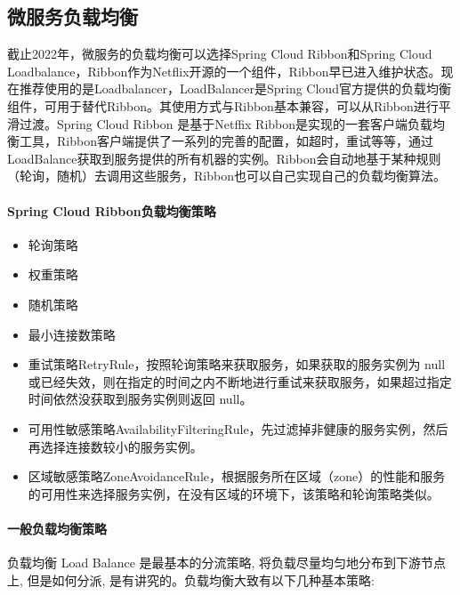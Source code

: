 \documentclass[../../../interview-questions.tex]{subfiles}
\begin{document}
\subsection{微服务负载均衡}

截止2022年，微服务的负载均衡可以选择Spring Cloud Ribbon和Spring Cloud Loadbalance，Ribbon作为Netflix开源的一个组件，Ribbon早已进入维护状态。现在推荐使用的是Loadbalancer，LoadBalancer是Spring Cloud官方提供的负载均衡组件，可用于替代Ribbon。其使用方式与Ribbon基本兼容，可以从Ribbon进行平滑过渡。Spring Cloud Ribbon 是基于​​Netffix Ribbon​​​是实现的一套客户端负载均衡工具，Ribbon客户端提供了一系列的完善的配置，如超时，重试等等，通过​​LoadBalance​​​获取到服务提供的所有机器的实例。Ribbon会自动地基于某种规则​​（轮询，随机）​​ 去调用这些服务，Ribbon也可以自己实现自己的负载均衡算法。

\paragraph{Spring Cloud Ribbon负载均衡策略}

\begin{itemize}
    \item {轮询策略}
    \item {权重策略}
    \item {随机策略}
    \item {最小连接数策略}
    \item {重试策略}RetryRule，按照轮询策略来获取服务，如果获取的服务实例为 null 或已经失效，则在指定的时间之内不断地进行重试来获取服务，如果超过指定时间依然没获取到服务实例则返回 null。
    \item {可用性敏感策略}AvailabilityFilteringRule，先过滤掉非健康的服务实例，然后再选择连接数较小的服务实例。
    \item {区域敏感策略}ZoneAvoidanceRule，根据服务所在区域（zone）的性能和服务的可用性来选择服务实例，在没有区域的环境下，该策略和轮询策略类似。
\end{itemize}

\paragraph{一般负载均衡策略}

负载均衡 Load Balance 是最基本的分流策略, 将负载尽量均匀地分布到下游节点上, 但是如何分派, 是有讲究的。负载均衡大致有以下几种基本策略:
\end{document}
